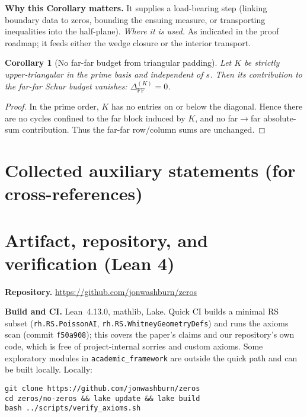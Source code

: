 \documentclass[11pt]{article}
\newtheorem{corollary}{Corollary}[section]
\theoremstyle{definition}
\theoremstyle{remark}
\begin{document}
\vspace{1.0cm}
\noindent\textbf{Why this Corollary matters.} It supplies a load-bearing step (linking boundary data to zeros, bounding the ensuing measure, or transporting inequalities into the half-plane).
\noindent\textit{Where it is used.} As indicated in the proof roadmap; it feeds either the wedge closure or the interior transport.
\begin{corollary}[No far-far budget from triangular padding]\label{cor:K-no-FF}
Let $K$ be strictly upper-triangular in the prime basis and independent of $s$. Then its contribution to the far-far Schur budget vanishes: $\Delta_{\mathrm{FF}}^{(K)}=0$.
\end{corollary}
\begin{proof}
In the prime order, $K$ has no entries on or below the diagonal. Hence there are no cycles confined to the far block induced by $K$, and no far$\to$far absolute-sum contribution. Thus the far-far row/column sums are unchanged.
\end{proof}
% 
\section*{Collected auxiliary statements (for cross-references)}
\section*{Artifact, repository, and verification (Lean 4)}
\vspace{-0.3em}
\noindent\textbf{Repository.} \url{https://github.com/jonwashburn/zeros} \quad

\noindent\textbf{Build and CI.} Lean~4.13.0, mathlib, Lake. Quick CI builds a minimal RS subset (\texttt{rh.RS.PoissonAI}, \texttt{rh.RS.WhitneyGeometryDefs}) and runs the axioms scan (commit \texttt{f50a908}); this covers the paper’s claims and our repository’s own code, which is free of project-internal sorries and custom axioms. Some exploratory modules in \texttt{academic\_framework} are outside the quick path and can be built locally. Locally:
\begin{verbatim}
git clone https://github.com/jonwashburn/zeros
cd zeros/no-zeros && lake update && lake build
bash ../scripts/verify_axioms.sh
\end{verbatim}
\end{document}
